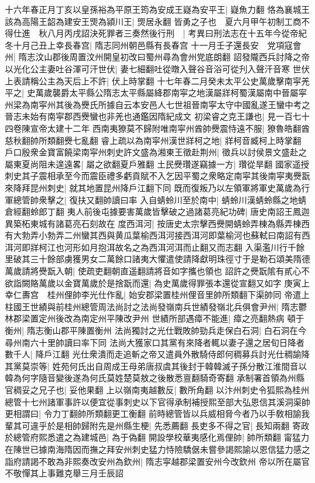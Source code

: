 十六年春正月丁亥以皇孫裕為平原王筠為安成王嶷為安平王|{
	嶷魚力翻}
恪為襄城王該為高陽王韶為建安王煚為潁川王|{
	煚居永翻}
皆勇之子也　夏六月甲午初制工商不得仕進　秋八月丙戌詔決死罪者三奏然後行刑　|{
	考異曰刑法志在十五年今從帝紀}
冬十月己丑上幸長春宫|{
	隋志同州朝邑縣有長春宫}
十一月壬子還長安　党項寇會州|{
	隋志汶山郡後周置汶州開皇初改曰蜀州尋為會州党底朗翻}
詔發隴西兵討降之帝以光化公主妻吐谷渾可汗世伏|{
	妻七細翻吐從暾入聲谷音浴可從刋入聲汗音寒}
世伏上表請稱公主為天后上不許|{
	伏上時掌翻}
十七年春二月癸未太平公史萬歲擊南寜羌平之|{
	史萬歲襲爵太平縣公隋志太平縣屬絳郡南寜之地漢屬牂柯蜀漢屬南中晉屬寜州梁為南寜州其後為㸑氏所據自云本安邑人七世祖晉南寜太守中國亂遂王蠻中考之晉志未始有南寜郡西㸑蠻也非羌也通鑑因隋紀成文}
初梁睿之克王謙也|{
	見一百七十四卷陳宣帝太建十二年}
西南夷獠莫不歸附唯南寜州酋帥㸑震恃遠不服|{
	獠魯皓翻酋慈秋翻帥所類翻㸑七亂翻}
睿上疏以為南寜州漢世牂柯之地|{
	牂柯音臧柯上時掌翻}
戶口殷衆金寶富饒梁南寜州刺史許文盛為湘東王徵赴荆州|{
	徵兵以討侯景文盛赴之}
屬東夏尚阻未遑遠畧|{
	屬之欲翻夏戶雅翻}
土民㸑瓚遂竊據一方|{
	瓚從旱翻}
國家遥授刺史其子震相承至今而震臣禮多虧貢賦不入乞因平蜀之衆略定南寜其後南寜夷㸑翫來降拜昆州刺史|{
	就其地置昆州降戶江翻下同}
既而復叛乃以左領軍將軍史萬歲為行軍總管帥衆擊之|{
	復扶又翻帥讀曰率}
入自蜻蛉川至於南中|{
	蜻蛉川漢蜻蛉縣之地蜻倉經翻蛉郎丁翻}
夷人前後屯據要害萬歲皆擊破之過諸葛亮紀功碑|{
	唐史南詔王鳳迦異築柘東城有諸葛亮石刻故在}
度西洱河|{
	按唐史太宗擊西㸑開蜻蛉弄棟為縣弄棟西有大勃弄小勃弄二州蠻其西與黄瓜葉榆西洱河接西洱河即葉榆河也蘇軾曰南詔有西洱河即牂柯江也河形如月抱洱故名之為西洱河洱而止翻又而志翻}
入渠濫川行千餘里破其三十餘部虜獲男女二萬餘口諸夷大懼遣使請降獻明珠徑寸于是勒石頌美隋德萬歲請將㸑翫入朝|{
	使疏吏翻朝直遥翻請將音如字攜也領也}
詔許之㸑翫隂有貳心不欲詣闕賂萬歲以金寶萬歲於是捨翫而還|{
	為史萬歲得罪張本還從宣翻又如字}
庚寅上幸仁夀宫　桂州俚帥李光仕作亂|{
	始安郡梁置桂州俚音里帥所類翻下渠帥同}
帝遣上柱國王世績與前桂州總管周法尚討之法尚發嶺南兵世績發嶺北兵俱會尹州|{
	隋志鬱林郡梁置定州後改為南定州平陳改尹州}
世績所部遇瘴不能進|{
	瘴之亮翻熱病}
頓于衡州|{
	隋志衡山郡平陳置衡州}
法尚獨討之光仕戰敗帥勁兵走保白石洞|{
	白石洞在今尋州南六十里帥讀曰率下同}
法尚大獲家口其黨有來降者輒以妻子還之居旬日降者數千人|{
	降戶江翻}
光仕衆潰而走追斬之帝又遣員外散騎侍郎何稠募兵討光仕稠諭降其黨莫崇等|{
	姓苑何氏出自周成王母弟唐叔虞其後封于韓韓滅子孫分散江淮間音以韓為何字隨音變後遂為何氏莫姓楚莫敖之後散悉亶翻騎奇寄翻}
承制署首領為州縣官稠妥之兄子也|{
	妥他果翻}
上以嶺南夷越數反|{
	數所角翻}
以汴州刺史令狐熙為桂州總管十七州諸軍事許以便宜從事刺史以下官得承制補授熙至部大弘恩信其溪洞渠帥更相謂曰|{
	令力丁翻帥所類翻更工衡翻}
前時總管皆以兵威相脅今者乃以手敎相諭我輩其可違乎於是相帥歸附先是州縣生梗|{
	先悉薦翻}
長吏多不得之官|{
	長知兩翻}
寄政於總管府熙悉遣之為建城邑|{
	為于偽翻}
開設學校華夷感化焉俚帥|{
	帥所類翻}
甯猛力在陳世已據南海隋因而撫之拜安州刺史猛力恃險驕倨未嘗參謁熙諭以恩信猛力感之詣府請謁不敢為非熙奏改安州為欽州|{
	隋志寜越郡梁置安州今改欽州}
帝以所在屬官不敬憚其上事難克舉三月壬辰詔

